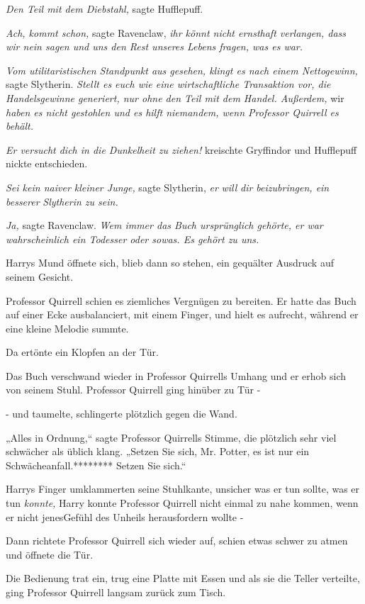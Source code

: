 {\emph{Den Teil mit dem Diebstahl,} sagte Hufflepuff.

\emph{Ach, kommt schon,} sagte Ravenclaw, \emph{ihr könnt nicht ernsthaft verlangen, dass wir nein sagen und uns den Rest unseres Lebens fragen, was es war.}

\emph{Vom utilitaristischen Standpunkt aus gesehen, klingt es nach einem Nettogewinn,} sagte Slytherin. \emph{Stellt es euch wie eine wirtschaftliche Transaktion vor, die Handelsgewinne generiert, nur ohne den Teil mit dem Handel. Außerdem,} wir \emph{haben es nicht gestohlen und es hilft niemandem, wenn Professor Quirrell es behält.}

\emph{Er versucht dich in die Dunkelheit zu ziehen!} kreischte Gryffindor und Hufflepuff nickte entschieden.

\emph{Sei kein naiver kleiner Junge,} sagte Slytherin, \emph{er} \emph{will} \emph{dir beizubringen, ein} \emph{besserer} \emph{Slytherin zu sein.}

\emph{Ja,} sagte Ravenclaw. \emph{Wem immer das Buch ursprünglich gehörte, er war wahrscheinlich ein Todesser oder sowas. Es gehört zu uns.}

Harrys Mund öffnete sich, blieb dann so stehen, ein gequälter Ausdruck auf seinem Gesicht.

Professor Quirrell schien es ziemliches Vergnügen zu bereiten. Er hatte das Buch auf einer Ecke ausbalanciert, mit einem Finger, und hielt es aufrecht, während er eine kleine Melodie summte.

Da ertönte ein Klopfen an der Tür.

Das Buch verschwand wieder in Professor Quirrells Umhang und er erhob sich von seinem Stuhl. Professor Quirrell ging hinüber zu Tür -

- und taumelte, schlingerte plötzlich gegen die Wand.

„Alles in Ordnung,“ sagte Professor Quirrells Stimme, die plötzlich sehr viel schwächer als üblich klang. „Setzen Sie sich, Mr. Potter, es ist nur ein Schwächeanfall.******** Setzen Sie sich.“

Harrys Finger umklammerten seine Stuhlkante, unsicher was er tun sollte, was er tun \emph{konnte,} Harry konnte Professor Quirrell nicht einmal zu nahe kommen, wenn er nicht jenesGefühl des Unheils herausfordern wollte -

Dann richtete Professor Quirrell sich wieder auf, schien etwas schwer zu atmen und öffnete die Tür.

Die Bedienung trat ein, trug eine Platte mit Essen und als sie die Teller verteilte, ging Professor Quirrell langsam zurück zum Tisch.

}
